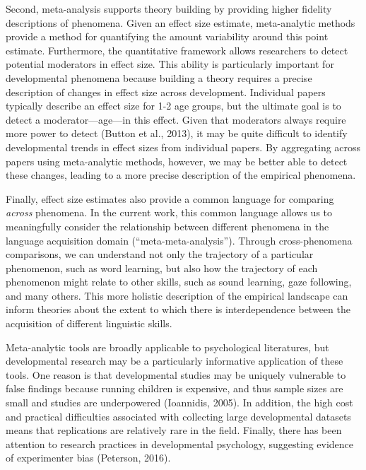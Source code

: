 \documentclass[english,floatsintext,man]{apa6}
\begin{document}
Second, meta-analysis supports theory building by providing higher
fidelity descriptions of phenomena. Given an effect size estimate,
meta-analytic methods provide a method for quantifying the amount
variability around this point estimate. Furthermore, the quantitative
framework allows researchers to detect potential moderators in effect
size. This ability is particularly important for developmental phenomena
because building a theory requires a precise description of changes in
effect size across development. Individual papers typically describe an
effect size for 1-2 age groups, but the ultimate goal is to detect a
moderator---age---in this effect. Given that moderators always require
more power to detect (Button et al., 2013), it may be quite difficult to
identify developmental trends in effect sizes from individual papers. By
aggregating across papers using meta-analytic methods, however, we may
be better able to detect these changes, leading to a more precise
description of the empirical phenomena.

Finally, effect size estimates also provide a common language for
comparing \emph{across} phenomena. In the current work, this common
language allows us to meaningfully consider the relationship between
different phenomena in the language acquisition domain
(\enquote{meta-meta-analysis}). Through cross-phenomena comparisons, we
can understand not only the trajectory of a particular phenomenon, such
as word learning, but also how the trajectory of each phenomenon might
relate to other skills, such as sound learning, gaze following, and many
others. This more holistic description of the empirical landscape can
inform theories about the extent to which there is interdependence
between the acquisition of different linguistic skills.

Meta-analytic tools are broadly applicable to psychological literatures,
but developmental research may be a particularly informative application
of these tools. One reason is that developmental studies may be uniquely
vulnerable to false findings because running children is expensive, and
thus sample sizes are small and studies are underpowered (Ioannidis,
2005). In addition, the high cost and practical difficulties associated
with collecting large developmental datasets means that replications are
relatively rare in the field. Finally, there has been attention to
research practices in developmental psychology, suggesting evidence of
experimenter bias (Peterson, 2016).
\end{document}
